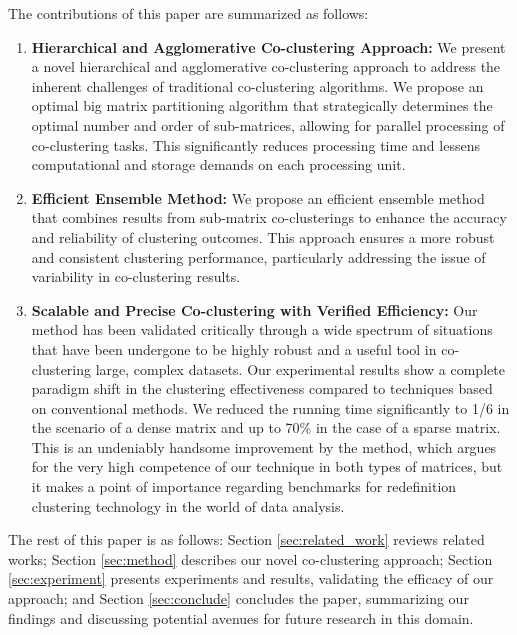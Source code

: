 The contributions of this paper are summarized as follows:
\begin{enumerate}
    \item \textbf{Hierarchical and Agglomerative Co-clustering Approach:} We present a novel hierarchical and agglomerative co-clustering approach to address the inherent challenges of traditional co-clustering algorithms. We propose an optimal big matrix partitioning algorithm that strategically determines the optimal number and order of sub-matrices, allowing for parallel processing of co-clustering tasks. This significantly reduces processing time and lessens computational and storage demands on each processing unit.
    \item \textbf{Efficient Ensemble Method:} We propose an efficient ensemble method that combines results from sub-matrix co-clusterings to enhance the accuracy and reliability of clustering outcomes. This approach ensures a more robust and consistent clustering performance, particularly addressing the issue of variability in co-clustering results.
    \item \textbf{Scalable and Precise Co-clustering with Verified Efficiency:} Our method has been validated critically through a wide spectrum of situations that have been undergone to be highly robust and a useful tool in co-clustering large, complex datasets. Our experimental results show a complete paradigm shift in the clustering effectiveness compared to techniques based on conventional methods. 
    We reduced the running time significantly to 1/6 in the scenario of a dense matrix and up to 70\% in the case of a sparse matrix.
    This is an undeniably handsome improvement by the method, which argues for the very high competence of our technique in both types of matrices, but it makes a point of importance regarding benchmarks for redefinition clustering technology in the world of data analysis. 
\end{enumerate}

The rest of this paper is as follows: Section \ref{sec:related_work} reviews related works; Section \ref{sec:method} describes our novel co-clustering approach; Section \ref{sec:experiment} presents experiments and results, validating the efficacy of our approach; and Section \ref{sec:conclude} concludes the paper, summarizing our findings and discussing potential avenues for future research in this domain.

